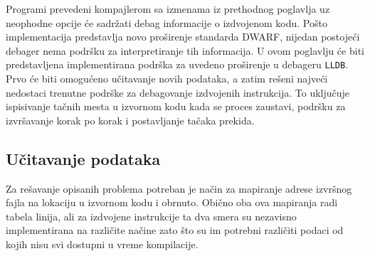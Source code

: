 \documentclass[12pt,oneside]{memoir}
\begin{document}
Programi prevedeni kompajlerom sa izmenama iz prethodnog poglavlja uz neophodne opcije će sadržati debag informacije o izdvojenom kodu.
Pošto implementacija predstavlja novo proširenje standarda DWARF, nijedan postojeći debager nema podršku za interpretiranje tih informacija.
U ovom poglavlju će biti predstavljena implementirana podrška za uvedeno proširenje u debageru \verb|LLDB|.
Prvo će biti omogućeno učitavanje novih podataka, a zatim rešeni najveći nedostaci trenutne podrške za debagovanje izdvojenih instrukcija.
To uključuje ispisivanje tačnih mesta u izvornom kodu kada se proces zaustavi, podršku za izvršavanje korak po korak i postavljanje tačaka prekida.


\subsection{Učitavanje podataka}

\label{sec:debugger_loading}

Za rešavanje opisanih problema potreban je način za mapiranje adrese izvršnog fajla na lokaciju u izvornom kodu i obrnuto.
Obično oba ova mapiranja radi tabela linija, ali za izdvojene instrukcije ta dva smera su nezavisno implementirana na različite načine zato što su im potrebni različiti podaci od kojih nisu svi dostupni u vreme kompilacije.
\end{document}
